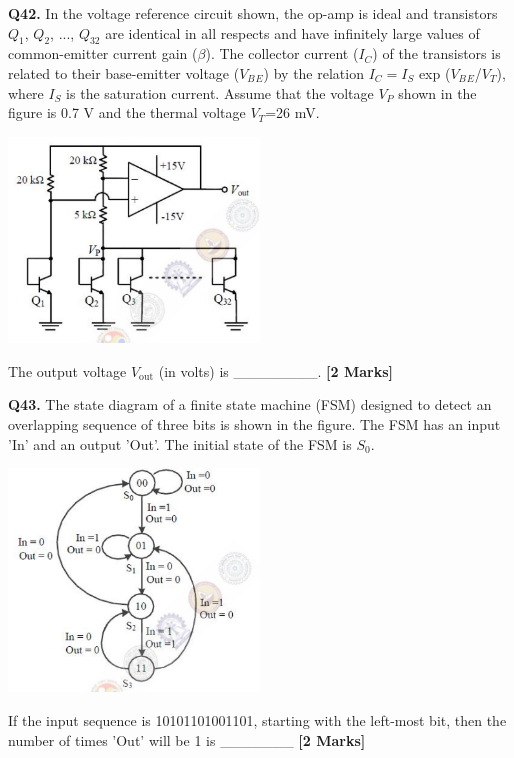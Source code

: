 \documentclass[11pt]{article}
\newcommand{\questionb}[2]{
    \noindent\textbf{Q#2.} #1 \hfill \textbf{[2 Marks]}
}
\begin{document}
\vspace{0.5cm}

\questionb{In the voltage reference circuit shown, the op-amp is ideal and transistors $Q_1$, $Q_2$, ..., $Q_{32}$ are identical in all respects and have infinitely large values of common-emitter current gain ($\beta$). The collector current ($I_C$) of the transistors is related to their base-emitter voltage  ($V_B$$_E$) by the relation $I_C = I_S$ exp ($V_B$$_E$/$V_T$), where $I_S$ is the saturation current. Assume that the voltage $V_P$ shown in the figure is 0.7 V and the thermal voltage $V_T$=26 mV.
\begin{center}
\includegraphics[width=0.5\textwidth]{figures/42.png}
\end{center}
The output voltage $V_{\text{out}}$ (in volts) is \_\_\_\_\_\_\_\_.}{42}

\vspace{0.5cm}

\questionb{The state diagram of a finite state machine (FSM) designed to detect an overlapping sequence of three bits is shown in the figure. The FSM has an input 'In' and an output 'Out'. The initial state of the FSM is $S_0$.
\begin{center}
\includegraphics[width=0.5\textwidth]{figures/43.png}
\end{center}
If the input sequence is 10101101001101, starting with the left-most bit, then the number of times 'Out' will be 1 is \_\_\_\_\_\_\_}{43}
\end{document}
